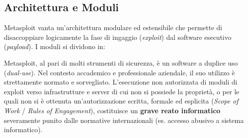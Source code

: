 \begin{center}
\end{center}

\subsection{Architettura e Moduli}
Metasploit vanta un'architettura modulare ed estensibile che permette di disaccoppiare logicamente la fase di ingaggio (\textit{exploit}) dal software esecutivo (\textit{payload}). I moduli si dividono in:

\begin{warnbox}
Metasploit, al pari di molti strumenti di sicurezza, è un software a duplice uso (\textit{dual-use}). Nel contesto accademico e professionale aziendale, il suo utilizzo è strettamente normato e sorvegliato. L'esecuzione non autorizzata di moduli di exploit verso infrastrutture e server di cui non si possiede la proprietà, o per le quali non si è ottenuta un'autorizzazione scritta, formale ed esplicita (\textit{Scope of Work} / \textit{Rules of Engagement}), costituisce un \textbf{grave reato informatico} severamente punito dalle normative internazionali (es. accesso abusivo a sistema informatico).
\end{warnbox}
